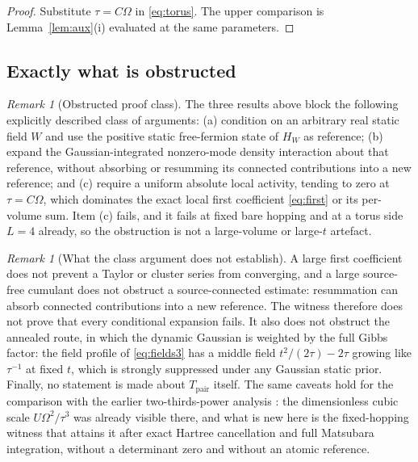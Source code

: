 \documentclass[11pt]{article}
\theoremstyle{definition}
\theoremstyle{remark}
\newtheorem{remark}[theorem]{Remark}
\newcommand{\pair}{\mathrm{pair}}
\newcommand{\Tpair}{T_{\pair}}
\begin{document}
\begin{proof}
Substitute $\tau=C\Omega$ in \eqref{eq:torus}. The upper comparison is
Lemma~\ref{lem:aux}(i) evaluated at the same parameters.
\end{proof}

\subsection{Exactly what is obstructed}

\begin{remark}[Obstructed proof class]
\label{rem:class}
The three results above block the following explicitly described class of arguments:
(a) condition on an arbitrary real static field $W$ and use the positive static
free-fermion state of $H_W$ as reference; (b) expand the Gaussian-integrated
nonzero-mode density interaction about that reference, without absorbing or
resumming its connected contributions into a new reference; and (c) require a
uniform absolute local activity, tending to zero at $\tau=C\Omega$, which dominates
the exact local first coefficient \eqref{eq:first} or its per-volume sum. Item (c)
fails, and it fails at fixed bare hopping and at a torus side $L=4$ already, so the
obstruction is not a large-volume or large-$t$ artefact.
\end{remark}

\begin{remark}[What the class argument does not establish]
\label{rem:notclass}
A large first coefficient does not prevent a Taylor or cluster series from
converging, and a large source-free cumulant does not obstruct a source-connected
estimate: resummation can absorb connected contributions into a new reference. The
witness therefore does not prove that every conditional expansion fails. It also does
not obstruct the annealed route, in which the dynamic Gaussian is weighted by the
full Gibbs factor: the field profile of \eqref{eq:fields3} has a middle field
$t^2/(2\tau)-2\tau$ growing like $\tau^{-1}$ at fixed $t$, which is strongly
suppressed under any Gaussian static prior. Finally, no statement is made about
$\Tpair$ itself. The same caveats hold for the comparison with the earlier
two-thirds-power analysis \cite{linear4,linear5}: the dimensionless cubic scale
$U\Omega^2/\tau^3$ was already visible there, and what is new here is the fixed-hopping
witness that attains it after exact Hartree cancellation and full Matsubara
integration, without a determinant zero and without an atomic reference.
\end{remark}
\end{document}
